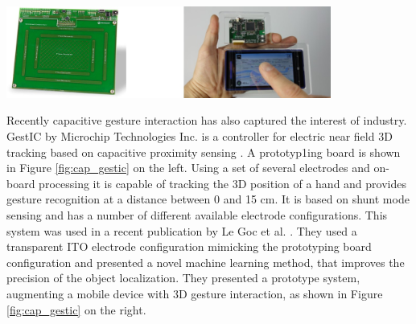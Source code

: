 \begin{minipage}{\linewidth}
\centering
\includegraphics[width=0.8\textwidth]{images/cap_gestic}
\label{fig:cap_gestic}
\end{minipage}

Recently capacitive gesture interaction has also captured the interest of industry. GestIC by Microchip Technologies Inc. is a controller for electric near field 3D tracking based on capacitive proximity sensing \cite{microchip2013}. A prototyp1ing board is shown in Figure \ref{fig:cap_gestic} on the left. Using a set of several electrodes and on-board processing it is capable of tracking the 3D position of a hand and provides gesture recognition at a distance between 0 and 15 cm. It is based on shunt mode sensing and has a number of different available electrode configurations. This system was used in a recent publication by Le Goc et al. \cite{le2014low}. They used a transparent ITO electrode configuration mimicking the prototyping board configuration and presented a novel machine learning method, that improves the precision of the object localization. They presented a prototype system, augmenting a mobile device with 3D gesture interaction, as shown in Figure \ref{fig:cap_gestic} on the right.



